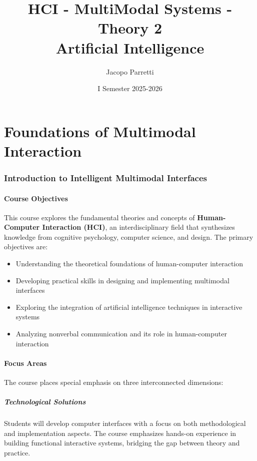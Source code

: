 \documentclass[11pt,a4paper]{article}
\title{\textbf{HCI - MultiModal Systems - Theory 2}\\
\large Artificial Intelligence}
\author{Jacopo Parretti}
\date{I Semester 2025-2026}
\theoremstyle{definition}
\theoremstyle{plain}
\theoremstyle{remark}
\begin{document}
\maketitle
\newpage
\tableofcontents
\newpage

\part{Foundations of Multimodal Interaction}

\section{Introduction to Intelligent Multimodal Interfaces}

\subsection{Course Objectives}

This course explores the fundamental theories and concepts of \textbf{Human-Computer Interaction (HCI)}, an interdisciplinary field that synthesizes knowledge from cognitive psychology, computer science, and design. The primary objectives are:

\begin{itemize}
    \item Understanding the theoretical foundations of human-computer interaction
    \item Developing practical skills in designing and implementing multimodal interfaces
    \item Exploring the integration of artificial intelligence techniques in interactive systems
    \item Analyzing nonverbal communication and its role in human-computer interaction
\end{itemize}

\subsection{Focus Areas}

The course places special emphasis on three interconnected dimensions:

\subsubsection{Technological Solutions}

Students will develop computer interfaces with a focus on both methodological and implementation aspects. The course emphasizes hands-on experience in building functional interactive systems, bridging the gap between theory and practice.
\end{document}
